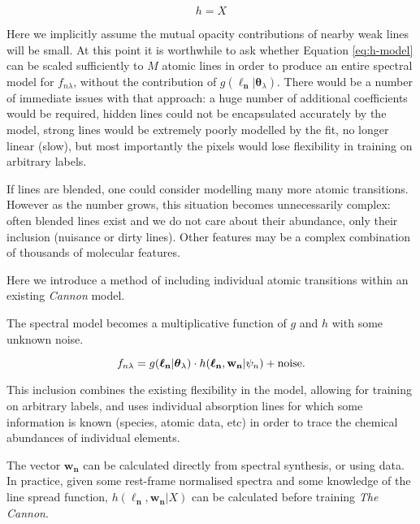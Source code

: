 \documentclass[useAMS,usenatbib]{mn2e}
\newcommand\tc{\textit{The Cannon}}
\newcommand\lv{\mathbf{\boldsymbol\ell_n}}
\newcommand\cv{{\boldsymbol\theta}_\lambda}
\newcommand\wv{\mathbf{w_n}}
\newcommand\given{|}
\begin{document}
\begin{equation}
h = X
\label{eq:h-model}
\end{equation}

Here we implicitly assume the mutual opacity contributions of nearby weak lines will be small. 
At this point it is worthwhile to ask whether Equation \ref{eq:h-model} can be scaled sufficiently to $M$ atomic lines in order to produce an entire spectral model for $f_{n\lambda}$, without the contribution of $g\left(\lv\given\cv\right)$. There would be a number of immediate issues with that approach: a huge number of additional coefficients would be required, hidden lines could not be encapsulated accurately by the model, strong lines would be extremely poorly modelled by the fit, no longer linear (slow), but most importantly the pixels would lose flexibility in training on arbitrary labels. 

If lines are blended, one could consider modelling many more atomic transitions.
However as the number grows, this situation becomes unnecessarily complex:
often blended lines exist and we do not care about their abundance, only their
inclusion (nuisance or dirty lines). Other features may be a complex combination
of thousands of molecular features.

Here we introduce a method of including individual atomic transitions within an existing \textit{Cannon} model.

The spectral model becomes a multiplicative function of $g$ and $h$ with some
unknown noise.

\begin{equation}
    f_{n\lambda} = g(\lv\given\cv) \cdot h(\lv,\wv\given\psi_n) +  {\rm noise}.
\end{equation}

This inclusion combines the existing flexibility in the model, allowing for training on arbitrary labels, and uses individual absorption lines for which some information is known (species, atomic data, etc) in order to trace the chemical abundances of individual elements.


The vector $\wv$ can be calculated directly from spectral synthesis, or using data.
In practice, given some rest-frame normalised spectra and some knowledge of the
line spread function, $h(\lv,\wv\given{}X)$ can be calculated before training \tc.



\end{document}
